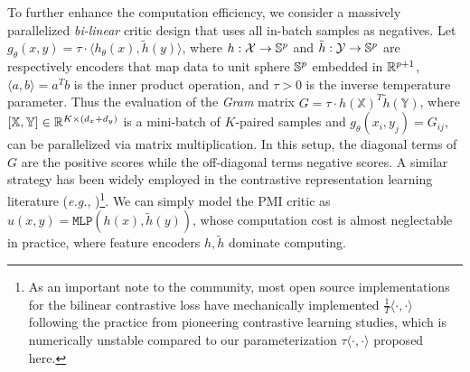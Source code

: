 \documentclass{article}
\theoremstyle{plain}
\theoremstyle{definition}
\theoremstyle{remark}
\newcommand{\BX}{\mathbb{X}}
\newcommand{\BY}{\mathbb{Y}}
\newcommand{\SimCLR}{\texttt{SimCLR}}
\begin{document}
		To further enhance the computation efficiency, we consider a massively parallelized {\it bi-linear} critic design that uses all in-batch samples as negatives. Let $g_\theta(x,y) = \tau \cdot \langle h_{\theta}(x), \tilde{h}(y) \rangle$, where $h: \mathcal{X} \rightarrow \mathbb{S}^p$ and $\tilde{h}: \mathcal{Y} \rightarrow \mathbb{S}^p$ are respectively encoders that map data to unit sphere $\mathbb{S}^p$ embedded in $\mathbb{R}^{p+1}$, $\langle a, b \rangle = a^T b$ is the inner product operation, and $\tau>0$ is the inverse temperature parameter. Thus the evaluation of the {\it Gram} matrix $G = \tau \cdot h(\BX)^T \tilde{h}(\BY)$, where $[\BX, \BY] \in \BR^{K \times (d_x+d_y)}$ is a mini-batch of $K$-paired samples and $g_{\theta}(x_i, y_j) = G_{ij}$, can be parallelized via matrix multiplication. In this setup, the diagonal terms of $G$ are the positive scores while the off-diagonal terms negative scores. A similar strategy has been widely employed in the contrastive representation learning literature ({\it e.g.}, \cite{chen2020simple})\footnote{As an important note to the community, most open source implementations for the bilinear contrastive loss have mechanically implemented $\frac{1}{T} \langle \cdot, \cdot \rangle$ following the practice from pioneering contrastive learning studies, which is numerically unstable compared to our parameterization $\tau \langle \cdot, \cdot \rangle$ proposed here.}. We can simply model the PMI critic as $u(x,y) = \texttt{MLP}(h(x), \tilde{h}(y))$, whose computation cost is almost neglectable in practice, where feature encoders $h,\tilde{h}$ dominate computing.
		
\end{document}
